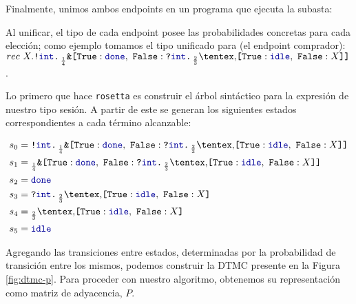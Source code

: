 Finalmente, unimos ambos endpoints en un programa que ejecuta la subasta:

\TestAuction

Al unificar, el tipo de cada endpoint posee las probabilidades concretas para
cada elección; como ejemplo tomamos el tipo unificado para  (el
endpoint comprador): $rec\
X.\Out\tint\BinaryPBranch[\frac{1}{4}]{\Done}{\In\tint\BinaryPChoice[\frac{2}{3}]{\Idle}{X}}$.

Lo primero que hace \texttt{rosetta} es construir el árbol sintáctico para la expresión
de nuestro tipo sesión. A partir de este se generan los siguientes estados
correspondientes a cada término alcanzable:

\begin{align*}
	s_0 &= \Out\tint\BinaryPBranch[\frac{1}{4}]{\Done}{\In\tint\BinaryPChoice[\frac{2}{3}]{\Idle}{X}} \\
	s_1 &= \BinaryPBranch[\frac{1}{4}]{\Done}{\In\tint\BinaryPChoice[\frac{2}{3}]{\Idle}{X}} \\
	s_2 &= \Done \\
	s_3 &= \In\tint\BinaryPChoice[\frac{2}{3}]{\Idle}{X} \\
	s_4 &= \BinaryPChoice[\frac{2}{3}]{\Idle}{X} \\
	s_5 &= \Idle \\
\end{align*}

Agregando las transiciones entre estados, determinadas por la probabilidad de
transición entre los mismos, podemos construir la DTMC presente en la Figura
\ref{fig:dtmc-p}. Para proceder con nuestro algoritmo, obtenemos su
representación como matriz de adyacencia, $P$.

